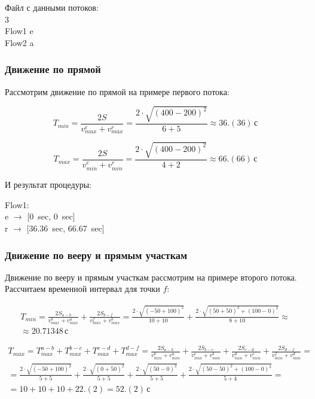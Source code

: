 \documentclass[12pt, a4 paper]{article}
\theoremstyle{plain}
\begin{document}
\noindent Файл с данными потоков:\\
3\\
Flow1 e\\
Flow2 a\\

\subsubsection{Движение по прямой}


Рассмотрим движение по прямой на примере первого потока:


$$
T_{min} = \frac{2S}{v_{max}^e + v_{max}^r} = \frac{2\cdot\sqrt{(400 - 200)^2}}{6 + 5} \approx 36.(36)\,\text{с}
$$

$$
T_{max} = \frac{2S}{v_{min}^e + v_{min}^r} = \frac{2\cdot\sqrt{(400 - 200)^2}}{4 + 2} \approx 66.(66)\,\text{с}
$$

И результат процедуры:

\noindent Flow1:\\
e $\rightarrow$ [0~sec, 0~sec]\\
r $\rightarrow$ [36.36~sec, 66.67~sec]



\subsubsection{Движение по вееру и прямым участкам}

Движение по вееру и прямым участкам рассмотрим на примере второго потока. Рассчитаем временной интервал для точки $f$:

\begin{multline}
T_{min} = \frac{2S_{a-b}}{v_{max}^b + v_{max}^a} + \frac{2S_{b-f}}{v_{max}^f + v_{max}^b}
= \frac{2\cdot\sqrt{(-50 + 100)^2}}{10 + 10} + \frac{2\cdot\sqrt{(50 + 50)^2 + (100-0)^2}}{8 + 10} \approx \\
 \approx 20.71348\,\text{с}
\end{multline}

\begin{multline}
T_{max} = T_{max}^{a-b} + T_{max}^{b-c} + T_{max}^{c-d} + T_{max}^{d-f} = 
 \frac{2S_{a-b}}{v_{min}^b + v_{min}^a} + \frac{2S_{b-c}}{v_{min}^c + v_{min}^b} +
 \frac{2S_{c-d}}{v_{min}^d + v_{min}^c} + \frac{2S_{d-f}}{v_{min}^f + v_{min}^d} = \\
 =\frac{2\cdot\sqrt{(-50 + 100)^2}}{5 + 5} + \frac{2\cdot\sqrt{(0 + 50)^2}}{5 + 5} +
 \frac{2\cdot\sqrt{(50 - 0)^2}}{5 + 5} + \frac{2\cdot\sqrt{(50 - 50)^2 + (100-0)^2}}{5 + 4} = \\
 = 10 + 10 + 10 + 22.(2) = 52.(2)\,\text{с}
\end{multline}
\end{document}
